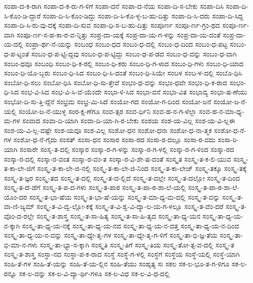 {ಸಂಪಾ-ದ-ಕ-ರಾಗಿ
ಸಂಪಾ-ದ-ಕ-ರು-ಗ-ಳಿಗೆ
ಸಂಪಾ-ದನೆ
ಸಂಪಾ-ದ-ನೆಯ
ಸಂಪಾ-ದಿ-ಸ-ಬೇಕು
ಸಂಪಾ-ದಿಸಿ
ಸಂಪಾ-ದಿ-ಸಿ-ಕೊಂ-ಡಿ-ದ್ದಾರೆ
ಸಂಪಾ-ದಿ-ಸಿ-ಕೊಂ-ಡಿದ್ದು
ಸಂಪಾ-ದಿ-ಸಿ-ಕೊ-ಳ್ಳ-ಬ-ಹು-ದಿತ್ತು
ಸಂಪಾ-ದಿ-ಸಿ-ದರು
ಸಂಪಾ-ದಿ-ಸಿದ್ದ
ಸಂಪಾ-ದಿ-ಸಿ-ರು-ವು-ದಕ್ಕೆ
ಸಂಪಾ-ದಿ-ಸುವ
ಸಂಪಾ-ಧಿ-ಸ-ಬ-ಹು-ದಿತ್ತು
ಸಂಪೂರ್ಣ
ಸಂಪೂ-ರ್ಣ-ಗ್ರಂ-ಥದ
ಸಂಪೂ-ರ್ಣ-ವಾಗಿ
ಸಂಪೂ-ರ್ಣ-ಸ-ಹ-ಕಾ-ರ-ವ-ನ್ನಿತ್ತು
ಸಂಪ್ರ-ದಾ-ಯಕ್ಕೆ
ಸಂಪ್ರ-ದಾ-ಯ-ಗ-ಳನ್ನು
ಸಂಪ್ರ-ದಾ-ಯ-ದಂತೆ
ಸಂಪ್ರ-ದಾ-ಯ-ದಲ್ಲಿ
ಸಂಪ್ರಾ-ರ್ಥ-ನೆ-ಯನ್ನು
ಸಂಬಂಧ
ಸಂಬಂ-ಧದ
ಸಂಬಂ-ಧ-ದಲ್ಲಿ
ಸಂಬಂ-ಧ-ದಿಂದ
ಸಂಬಂ-ಧ-ಪಟ್ಟ
ಸಂಬಂ-ಧ-ಪ-ಟ್ಟಂತೆ
ಸಂಬಂ-ಧ-ಪ-ಟ್ಟಿ-ದ್ದವು
ಸಂಬಂ-ಧ-ಪ-ಟ್ಟಿದ್ದು
ಸಂಬಂ-ಧ-ಪ-ಡದ
ಸಂಬಂ-ಧ-ವನ್ನು
ಸಂಬಂ-ಧ-ವಾಗಿ
ಸಂಬಂ-ಧವೂ
ಸಂಬಂಧಿ
ಸಂಬಂ-ಧಿ-ಕ-ರಲ್ಲಿ
ಸಂಬಂ-ಧಿ-ಕರು
ಸಂಬಂ-ಧಿ-ಗ-ಳಾದ
ಸಂಬಂ-ಧಿ-ಗಳು
ಸಂಬಂ-ಧಿ-ಯಾದ
ಸಂಬಂ-ಧಿ-ಯೊ-ಬ್ಬರು
ಸಂಬಂ-ಧಿ-ಸಿದ
ಸಂಬಂ-ಧಿ-ಸಿ-ದಂತೆ
ಸಂಬಂ-ಧಿ-ಸಿಯೇ
ಸಂಬಳ
ಸಂಬ-ಳ-ದಲ್ಲಿ
ಸಂಬೊ-ಧಿಸಿ
ಸಂಬೋ-ಧಿ-ಸಲು
ಸಂಬೋ-ಧಿಸಿ
ಸಂಬೋ-ಧಿ-ಸು-ತ್ತೇವೆ
ಸಂಭಂ-ಧ-ವನ್ನು
ಸಂಭಂ-ಧವೇ
ಸಂಭಂ-ಧಿ-ಕ-ರಾದ
ಸಂಭಂ-ಧಿ-ಸಿದ
ಸಂಭ-ವಿ-ಸಿದ
ಸಂಭ-ವಿ-ಸಿ-ವೆ-ಯೆಂದೇ
ಸಂಭಾ-ಳಿ-ಸಿದ
ಸಂಭಾ-ವನೆ
ಸಂಭಾ-ವಿತ
ಸಂಭಾವ್ಯ
ಸಂಭಾ-ಷ-ಣೆಯು
ಸಂಭೋ-ದಿ-ಸು-ತ್ತಿ-ದ್ದೆನೆ
ಸಂಭ್ರಮ
ಸಂಭ್ರ-ಮಿ-ಸಿದೆ
ಸಂಯೋ-ಗದ
ಸಂಯೋ-ಗ-ದಿಂದ
ಸಂಯೋ-ಜನೆ
ಸಂಯೋ-ಜ-ನೆ-ಯಲ್ಲಿ
ಸಂಯೋ-ಜ-ನೆ-ಯುಳ್ಳ
ಸಂರ-ಕ್ಷ-ಣೆಗೂ
ಸಂವ-ತ್ಸರ
ಸಂವ-ರ್ಧಿನಿ
ಸಂವ-ಹ-ನ-ಗ-ಳೆಲ್ಲಾ
ಸಂವ-ಹ-ನ-ಮಾ-ಧ್ಯ-ಮ-ಗಳ
ಸಂವಾದ
ಸಂವಾ-ದಿ-ಯಾಗಿ
ಸಂವಾ-ದಿ-ಯಾ-ಗಿ-ರ-ಬೇಕು
ಸಂಶಯ
ಸಂಶ-ಯ-ವಿಲ್ಲ
ಸಂಶ-ಯ-ವಿ-ಲ್ಲಈ
ಸಂಶ-ಯ-ವಿ-ಲ್ಲ-ವಷ್ಟೇ
ಸಂಶ-ಯವೂ
ಸಂಶ-ವಿಲ್ಲ
ಸಂಶೋ-ಧನ
ಸಂಶೋ-ಧನಾ
ಸಂಶೋ-ಧ-ನಾ-ತ್ಮಕ
ಸಂಶೋ-ಧ-ನೆ-ಗಳ
ಸಂಶೋ-ಧ-ನೆ-ಗೈದು
ಸಂಸತ್
ಸಂಸಾ-ಧನ
ಸಂಸಾರ
ಸಂಸಾ-ರದ
ಸಂಸಾ-ರ-ದಲ್ಲೂ
ಸಂಸಾ-ರ-ವದು
ಸಂಸಾ-ರಿ-ಯಾಗಿ
ಸಂಸಾರೇ
ಸಂಸೃ-ತ-ದಲ್ಲಿ
ಸಂಸ್ಕಾರ
ಸಂಸ್ಕಾ-ರ-ಗ-ಳನ್ನು
ಸಂಸ್ಕಾ-ರ-ಗ-ಳಲ್ಲಿ
ಸಂಸ್ಕಾ-ರ-ಗ-ಳಿಂದ
ಸಂಸ್ಕಾ-ರದ
ಸಂಸ್ಕಾ-ರ-ದಲ್ಲಿ
ಸಂಸ್ಕಾ-ರ-ವಂತ
ಸಂಸ್ಕಾ-ರ-ವಂ-ತ
ಸಂಸ್ಕಾ-ರ-ವಿ-ಶೇ-ಷ-ದಂತೆ
ಸಂಸ್ಕೃತ
ಸಂಸ್ಕೃ-ತ-ಕ-ಲಿ-ಯುವ
ಸಂಸ್ಕೃ-ತ-ಕಾ-ಲೇ-ಜಿಗೆ
ಸಂಸ್ಕೃ-ತ-ಕಾ-ಲೇ-ಜಿ-ನಲ್ಲಿ
ಸಂಸ್ಕೃ-ತ-ಕಾ-ಲೇ-ಜಿ-ನಿಂದ
ಸಂಸ್ಕೃ-ತ-ಕಾ-ಲೇಜ್
ಸಂಸ್ಕೃ-ತಕ್ಕೂ
ಸಂಸ್ಕೃ-ತಕ್ಕೆ
ಸಂಸ್ಕೃ-ತ-ಜ್ಞರ
ಸಂಸ್ಕೃ-ತದ
ಸಂಸ್ಕೃ-ತ-ದಲ್ಲಿ
ಸಂಸ್ಕೃ-ತ-ದ-ಲ್ಲಿದೆ
ಸಂಸ್ಕೃ-ತ-ದಲ್ಲೇ
ಸಂಸ್ಕೃ-ತ-ದಲ್ಲೋ
ಸಂಸ್ಕೃ-ತ-ದಿಂದ
ಸಂಸ್ಕೃ-ತ-ದೆ-ಡೆಗೆ
ಸಂಸ್ಕೃ-ತ-ಪ-ದ-ಗಳು
ಸಂಸ್ಕೃ-ತ-ಪಾಠ
ಸಂಸ್ಕೃ-ತ-ಪಾ-ಠ-ಶಾ-ಲೆ-ಯಲ್ಲಿ
ಸಂಸ್ಕೃ-ತ-ಪಾ-ಠ-ಶಾ-ಲೆ-ಯೊಂ-ದರ
ಸಂಸ್ಕೃ-ತ-ಭಾ-ಷೆಯ
ಸಂಸ್ಕೃ-ತ-ಭಾ-ಷೆ-ಯನ್ನು
ಸಂಸ್ಕೃ-ತ-ಮಾ-ಧ್ಯ-ಮ-ದಲ್ಲಿ
ಸಂಸ್ಕೃ-ತ-ವನ್ನು
ಸಂಸ್ಕೃ-ತ-ವಾ-ಣಿ-ಜ್ಯಮ್
ಸಂಸ್ಕೃ-ತ-ವಿ-ದ್ವ-ಲ್ಲೋ-ಕಕ್ಕೆ
ಸಂಸ್ಕೃ-ತ-ವಿ-ಶ್ವ-ವಿ-ದ್ಯಾ-ಲ-ಯ-ಗ-ಳಲ್ಲೂ
ಸಂಸ್ಕೃ-ತ-ವೆಂ-ದರೆ
ಸಂಸ್ಕೃ-ತ-ವೊಂ-ದ-ರಲ್ಲೇ
ಸಂಸ್ಕೃ-ತ-ಶಾಸ್ತ್ರ
ಸಂಸ್ಕೃ-ತ-ಸಾ-ಹಿತ್ಯ
ಸಂಸ್ಕೃ-ತ-ಸಾ-ಹಿ-ತ್ಯದ
ಸಂಸ್ಕೃ-ತಾ-ಧ್ಯ-ಯನ
ಸಂಸ್ಕೃ-ತಾ-ಧ್ಯ-ಯ-ನ-ಕ್ಕಾಗಿ
ಸಂಸ್ಕೃ-ತಾ-ಧ್ಯ-ಯ-ನಕ್ಕೆ
ಸಂಸ್ಕೃ-ತಾ-ಧ್ಯ-ಯ-ನದ
ಸಂಸ್ಕೃ-ತಾ-ಧ್ಯ-ಯ-ನ-ದತ್ತ
ಸಂಸ್ಕೃ-ತಾ-ಧ್ಯ-ಯ-ನ-ದಿಂದ
ಸಂಸ್ಕೃ-ತಾ-ಧ್ಯ-ಯ-ನ-ವನ್ನು
ಸಂಸ್ಕೃ-ತಾ-ಧ್ಯೇ-ತೃ-ಗಳ
ಸಂಸ್ಕೃ-ತಾ-ಧ್ಯೇ-ತೃ-ಗ-ಳಿಗೆ
ಸಂಸ್ಕೃ-ತಾ-ಭಿ-ಜ್ಞ-ತೆಯ
ಸಂಸ್ಕೃ-ತಾ-ಭಿ-ಮಾ-ನ-ಗಳು
ಸಂಸ್ಕೃ-ತಾ-ಭ್ಯಾ-ಸ-ಕ್ಕಾಗಿ
ಸಂಸ್ಕೃತಿ
ಸಂಸ್ಕೃ-ತಿಗೆ
ಸಂಸ್ಕೃ-ತಿಯ
ಸಂಸ್ಕೃ-ತೋ-ತ್ಸ-ವ-ದಲ್ಲಿ
ಸಂಸ್ಕೃ-ತ
ಸಂಸ್ಕೃ-ತ-ಶಾಸ್ತ್ರ
ಸಂಸ್ಥಾ-ನದ
ಸಂಸ್ಥಾ-ಪ-ಕ-ರಾದ
ಸಂಸ್ಥೆ
ಸಂಸ್ಥೆ-ಗ-ಳಲ್ಲಿ
ಸಂಸ್ಥೆಗೆ
ಸಂಸ್ಥೆಯ
ಸಂಸ್ಥೆ-ಯಲ್ಲಿ
ಸಂಸ್ಥೆ-ಯಾಗಿ
ಸಂಹಿ-ತೆ-ಗಳ
ಸಂಹಿ-ತೆ-ಯನ್ನು
ಸಂಹಿ-ತೆ-ಯ-ಲ್ಲಿನ
ಸಂಹಿ-ತೆಯು
ಸಂಹೃತ್ಯ
ಸಃ
ಸಕಲ
ಸಕ-ಲ-ಭೂ-ತ-ಗ-ಳಿಗೂ
ಸಕ-ಲ-ರನ್ನೂ
ಸಕ-ಲ-ವನ್ನು
ಸಕ-ಲ-ವಿ-ದ್ಯಾ-ರ್ಥಿ-ಗಳೂ
ಸಕ-ಲ-ವಿಧ
ಸಕ-ಲ-ವಿ-ಧ-ದಲ್ಲಿ
}
